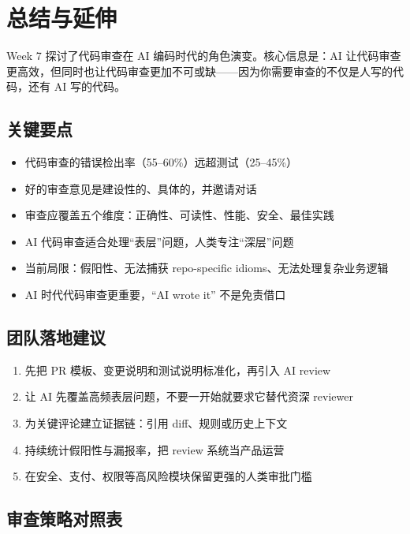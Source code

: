 \section{总结与延伸}

Week 7 探讨了代码审查在 AI 编码时代的角色演变。核心信息是：AI 让代码审查更高效，但同时也让代码审查更加不可或缺——因为你需要审查的不仅是人写的代码，还有 AI 写的代码。

\subsection{关键要点}

\begin{itemize}
    \item 代码审查的错误检出率（55--60\%）远超测试（25--45\%）
    \item 好的审查意见是建设性的、具体的，并邀请对话
    \item 审查应覆盖五个维度：正确性、可读性、性能、安全、最佳实践
    \item AI 代码审查适合处理``表层''问题，人类专注``深层''问题
    \item 当前局限：假阳性、无法捕获 repo-specific idioms、无法处理复杂业务逻辑
    \item AI 时代代码审查更重要，``AI wrote it'' 不是免责借口
\end{itemize}

\subsection{团队落地建议}

\begin{enumerate}
    \item 先把 PR 模板、变更说明和测试说明标准化，再引入 AI review
    \item 让 AI 先覆盖高频表层问题，不要一开始就要求它替代资深 reviewer
    \item 为关键评论建立证据链：引用 diff、规则或历史上下文
    \item 持续统计假阳性与漏报率，把 review 系统当产品运营
    \item 在安全、支付、权限等高风险模块保留更强的人类审批门槛
\end{enumerate}

\subsection{审查策略对照表}

